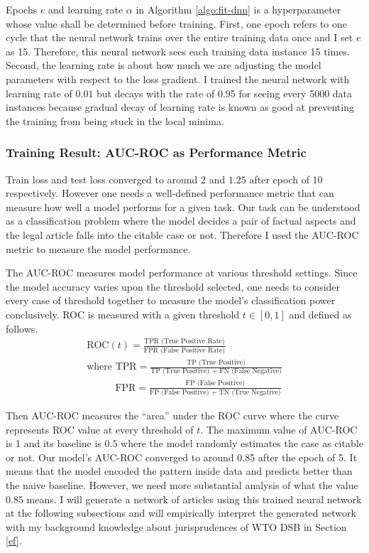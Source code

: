 \documentclass[12pt,letterpaper]{article}
\begin{document}
Epochs $e$ and learning rate $\alpha$ in Algorithm \ref{algo:fit-dnn} is a hyperparameter whose value shall be determined before training.
First, one epoch refers to one cycle that the neural network trains over the entire training data once and I set $e$ as 15. Therefore, this neural network sees each training data instance 15 times.
Second, the learning rate is about how much we are adjusting the model parameters with respect to the loss gradient. I trained the neural network with learning rate of $0.01$ but decays with the rate of 0.95 for seeing every 5000 data instances because gradual decay of learning rate is known as good at preventing the training from being stuck in the local minima.

\subsubsection{Training Result: AUC-ROC as Performance Metric}
Train loss and test loss converged to around $2$ and $1.25$ after epoch of 10 respectively.
However one needs a well-defined performance metric that can measure how well a model performs for a given task.
Our task can be understood as a classification problem where the model decides a pair of factual aspects and the legal article falls into the citable case or not.
Therefore I used the AUC-ROC metric to measure the model performance.
 
The AUC-ROC measures model performance at various threshold settings.
Since the model accuracy varies upon the threshold selected,
one needs to consider every case of threshold together to measure the model's classification power conclusively.
ROC is measured with a given threshold $t \in [0, 1]$ and defined as follows.
\begin{gather}
 \nonumber \text{ROC} (t) = \frac{\text{TPR (True Positive Rate)}}{\text{FPR (False Positive Rate)}}\\
 \nonumber \text{where } \text{TPR} = \frac{\text{TP (True Positive)}}{\text{TP (True Positive) + FN (False Negative)}}\\
 \nonumber \:\:\:\:\:\:\:\:\:\:\:\:\:\text{FPR} = \frac{\text{FP (False Positive)}}{\text{FP (False Positive) + TN (True Negative)}}
\end{gather}
 
Then AUC-ROC measures the ``area'' under the ROC curve where the curve represents ROC value at every threshold of $t$. The maximum value of AUC-ROC is 1 and its baseline is $0.5$ where the model randomly estimates the case as citable or not.
Our model's AUC-ROC converged to around 0.85 after the epoch of 5. It means that the model encoded the pattern inside data and predicts better than the naive baseline. %
However, we need more substantial analysis of what the value $0.85$ means. I will generate a network of articles using this trained neural network at the following subsections and will empirically interpret the generated network with my background knowledge about jurisprudences of WTO DSB in Section \ref{ef}.
\end{document}
